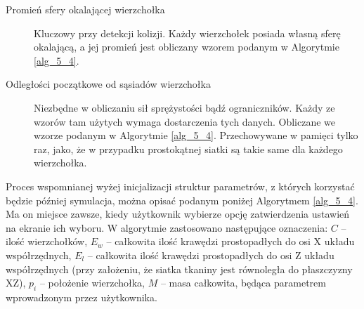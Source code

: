 \begin{description}
			\item[Promień sfery okalającej wierzchołka] Kluczowy przy detekcji kolizji. Każdy wierzchołek posiada własną sferę okalającą, a jej promień jest obliczany wzorem podanym w Algorytmie \ref{alg_5_4}.
			
			\item[Odległości początkowe od sąsiadów wierzchołka] Niezbędne w obliczaniu sił sprężystości bądź ograniczników. Każdy ze wzorów tam użytych wymaga dostarczenia tych danych. Obliczane we wzorze podanym w Algorytmie \ref{alg_5_4}. Przechowywane w pamięci tylko raz, jako, że w przypadku prostokątnej siatki są takie same dla każdego wierzchołka.
			
		\end{description}
		
		Proces wspomnianej wyżej inicjalizacji struktur parametrów, z których korzystać będzie później symulacja, można opisać podanym poniżej Algorytmem \ref{alg_5_4}. Ma on miejsce zawsze, kiedy użytkownik wybierze opcję zatwierdzenia ustawień na ekranie ich wyboru. W algorytmie zastosowano następujące oznaczenia: \(C\) -- ilość wierzchołków, \(E_{w}\) -- całkowita ilość krawędzi prostopadłych do osi X układu współrzędnych, \(E_{l}\) -- całkowita ilość krawędzi prostopadłych do osi Z układu współrzędnych (przy założeniu, że siatka tkaniny jest równoległa do płaszczyzny XZ), \(p_{i}\) -- położenie wierzchołka, \(M\) -- masa całkowita, będąca parametrem wprowadzonym przez użytkownika.
		
